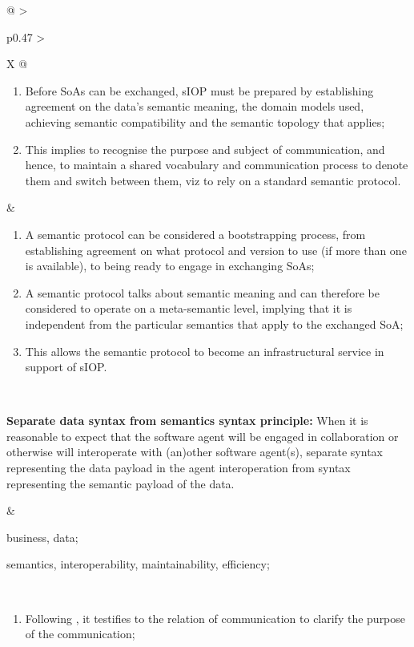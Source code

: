 \begin{xltabular}[l]{\linewidth}{@{} >{\small\raggedright\arraybackslash}p{0.47\linewidth} >{\small\raggedright\arraybackslash}X @{}}
\begin{enumerate}[left=6pt, nosep]
  \item Before SoAs can be exchanged, sIOP must be prepared by establishing agreement on the data's semantic meaning, the domain models used, achieving semantic compatibility and the semantic topology that applies;
  \item This implies to recognise the purpose and subject of communication, and hence, to maintain a shared vocabulary and communication process to denote them and switch between them, viz to rely on a standard semantic protocol.
\end{enumerate}
&
\begin{enumerate}[left=10pt, nosep]
  \item A semantic protocol can be considered a bootstrapping process, from establishing agreement on what protocol and version to use (if more than one is available), to being ready to engage in exchanging SoAs;
  \item A semantic protocol talks about semantic meaning and can therefore be considered to operate on a meta-semantic level, implying that it is independent from the particular semantics that apply to the exchanged SoA;
  \item This allows the semantic protocol to become an infrastructural service in support of sIOP.
\end{enumerate} \\
%
%
%
\begin{mmdp}\label{dp:sds-ss}{\bfseries Separate data syntax from semantics syntax principle:}
\quad When it is reasonable to expect that the software agent will be engaged in collaboration or otherwise will interoperate with (an)other software agent(s), separate syntax representing the data payload in the agent interoperation from syntax representing the semantic payload of the data.
\end{mmdp}
&
\begin{description}[labelwidth=3.7cm,leftmargin=3.7cm+1ex,nosep,topsep=2ex,labelsep=1ex,font=\bfseries]
  \item[Type of information:] business, data;
  \item[Quality attributes:] semantics, interoperability, maintainability, efficiency;
\end{description} \\
\begin{enumerate}[left=6pt, nosep]
  \item Following \cite{Grice:1991BT}, it testifies to the relation of communication to clarify the purpose of the communication;

\end{enumerate}
\end{xltabular}
